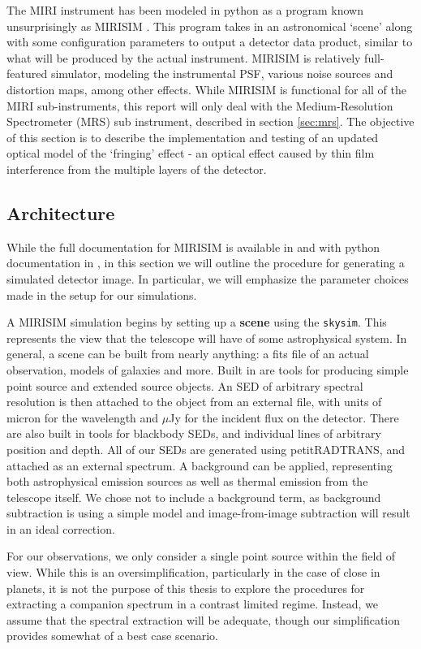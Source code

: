 The MIRI instrument has been modeled in python as a program known unsurprisingly as MIRISIM \parencite{ref:mirisimdocs}. 
This program takes in an astronomical `scene' along with some configuration parameters to output a detector data product, similar to what will be produced by the actual instrument.
MIRISIM is relatively full-featured simulator, modeling the instrumental PSF, various noise sources and distortion maps, among other effects.
While MIRISIM is functional for all of the MIRI sub-instruments, this report will only deal with the Medium-Resolution Spectrometer (MRS) sub instrument, described in section \ref{sec:mrs}.
The objective of this section is to describe the implementation and testing of an updated optical model of the `fringing' effect - an optical effect caused by thin film interference from the multiple layers of the detector.
\subsection{Architecture}
While the full documentation for MIRISIM is available in \parencite{ref:mirisimdocs} and with python documentation in \parencite{Cossou2018}, in this section we will outline the procedure for generating a simulated detector image.
In particular, we will emphasize the parameter choices made in the setup for our simulations.

A MIRISIM simulation begins by setting up a \textbf{scene} using the \verb|skysim|. 
This represents the view that the telescope will have of some astrophysical system.
In general, a scene can be built from nearly anything: a fits file of an actual observation, models of galaxies and more. 
Built in are tools for producing simple point source and extended source objects.
An SED of arbitrary spectral resolution is then attached to the object from an external file, with units of micron for the wavelength and $\mu$Jy for the incident flux on the detector.
There are also built in tools for blackbody SEDs, and individual lines of arbitrary position and depth.
All of our SEDs are generated using petitRADTRANS, and attached as an external spectrum.
A background can be applied, representing both astrophysical emission sources as well as thermal emission from the telescope itself.
We chose not to include a background term, as background subtraction is using a simple model and image-from-image subtraction will result in an ideal correction.

For our observations, we only consider a single point source within the field of view.
While this is an oversimplification, particularly in the case of close in planets, it is not the purpose of this thesis to explore the procedures for extracting a companion spectrum in a contrast limited regime.
Instead, we assume that the spectral extraction will be adequate, though our simplification provides somewhat of a best case scenario.

